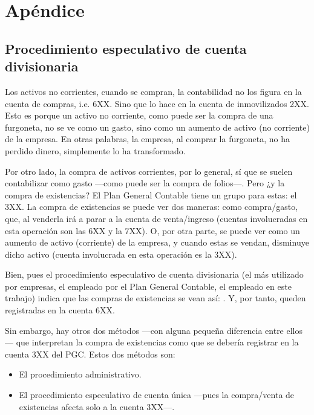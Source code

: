 \pagestyle{plain}


\section{Apéndice}

\subsection{Procedimiento especulativo de cuenta divisionaria}
\label{ap:pecd}
Los activos no corrientes, cuando se compran, la contabilidad no los figura en la cuenta de compras, i.e. 6XX. Sino que lo hace en la cuenta de inmovilizados 2XX. Esto es porque un activo no corriente, como puede ser la compra de una furgoneta, no se ve como un gasto, sino como un aumento de activo (no corriente) de la empresa. En otras palabras, la empresa, al comprar la furgoneta, no ha perdido dinero, simplemente lo ha transformado\fnm.

Por otro lado, la compra de activos corrientes, por lo general, sí que se suelen contabilizar como gasto ---como puede ser la compra de folios---. Pero ¿y la compra de existencias? El Plan General Contable tiene un grupo para estas: el 3XX. La compra de existencias se puede ver dos maneras: como compra/gasto, que, al venderla irá a parar a la cuenta de venta/ingreso (cuentas involucradas en esta operación son las 6XX y la 7XX). O, por otra parte, se puede ver como un aumento de activo (corriente) de la empresa, y cuando estas se vendan, disminuye dicho activo (cuenta involucrada en esta operación es la 3XX).

Bien, pues el procedimiento especulativo de cuenta divisionaria (el más utilizado por empresas, el empleado por el Plan General Contable, el empleado en este trabajo) indica que las compras de existencias se vean así: . Y, por tanto, queden registradas en la cuenta 6XX.

Sin embargo, hay otros dos métodos ---con alguna pequeña diferencia entre ellos--- que interpretan la compra de existencias como que se debería registrar en la cuenta 3XX del PGC. Estos dos métodos son:
\begin{itemize}
    \item El procedimiento administrativo.
    \item El procedimiento especulativo de cuenta única ---pues la compra/venta de existencias afecta solo a la cuenta 3XX---.
\end{itemize}
\clearpage
{}
